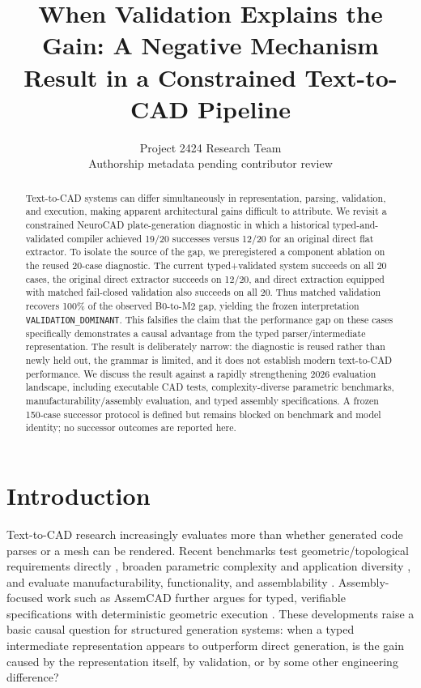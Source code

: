 \documentclass[10pt]{article}
\title{When Validation Explains the Gain: A Negative Mechanism Result in a Constrained Text-to-CAD Pipeline}
\author{Project 2424 Research Team\\\small Authorship metadata pending contributor review}
\date{}
\begin{document}
\maketitle

\begin{abstract}
Text-to-CAD systems can differ simultaneously in representation, parsing, validation, and execution, making apparent architectural gains difficult to attribute. We revisit a constrained NeuroCAD plate-generation diagnostic in which a historical typed-and-validated compiler achieved 19/20 successes versus 12/20 for an original direct flat extractor. To isolate the source of the gap, we preregistered a component ablation on the reused 20-case diagnostic. The current typed+validated system succeeds on all 20 cases, the original direct extractor succeeds on 12/20, and direct extraction equipped with matched fail-closed validation also succeeds on all 20. Thus matched validation recovers 100\% of the observed B0-to-M2 gap, yielding the frozen interpretation \texttt{VALIDATION\_DOMINANT}. This falsifies the claim that the performance gap on these cases specifically demonstrates a causal advantage from the typed parser/intermediate representation. The result is deliberately narrow: the diagnostic is reused rather than newly held out, the grammar is limited, and it does not establish modern text-to-CAD performance. We discuss the result against a rapidly strengthening 2026 evaluation landscape, including executable CAD tests, complexity-diverse parametric benchmarks, manufacturability/assembly evaluation, and typed assembly specifications. A frozen 150-case successor protocol is defined but remains blocked on benchmark and model identity; no successor outcomes are reported here.
\end{abstract}

\section{Introduction}
Text-to-CAD research increasingly evaluates more than whether generated code parses or a mesh can be rendered. Recent benchmarks test geometric/topological requirements directly \cite{mallis2026cadtests}, broaden parametric complexity and application diversity \cite{wang2026text2cadbench}, and evaluate manufacturability, functionality, and assemblability \cite{dong2026muse}. Assembly-focused work such as AssemCAD further argues for typed, verifiable specifications with deterministic geometric execution \cite{dong2026assemcad}. These developments raise a basic causal question for structured generation systems: when a typed intermediate representation appears to outperform direct generation, is the gain caused by the representation itself, by validation, or by some other engineering difference?
\end{document}
